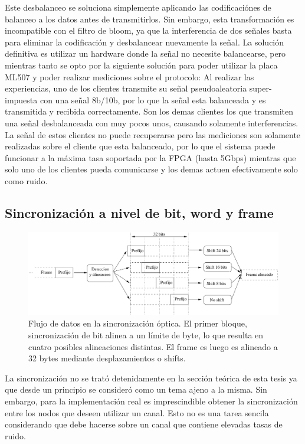 Este desbalanceo se soluciona simplemente aplicando las codificaciónes de balanceo a los datos antes de transmitirlos. Sin embargo, esta transformación es incompatible con el filtro de bloom, ya que la interferencia de dos señales basta para eliminar la codificación y desbalancear nuevamente la señal. La solución definitiva es utilizar un hardware donde la señal no necesite balancearse, pero mientras tanto se opto por la siguiente solución para poder utilizar la placa ML507 y poder realizar mediciones sobre el protocolo: Al realizar las experiencias, uno de los clientes transmite su señal pseudoaleatoria super-impuesta con una señal 8b/10b, por lo que la señal esta balanceada y es transmitida y recibida correctamente. Son los demas clientes los que transmiten una señal desbalanceada con muy pocos unos, causando solamente interferencias. La señal de estos clientes no puede recuperarse pero las mediciones son solamente realizadas sobre el cliente que esta balanceado, por lo que el sistema puede funcionar a la máxima tasa soportada por la FPGA (hasta 5Gbps) mientras que solo uno de los clientes pueda comunicarse y los demas actuen efectivamente solo como ruido.

\subsection{Sincronización a nivel de bit, word y frame}

\begin{figure}[t]
  \centering
    \includegraphics[width=6in]{graphs/optsync.pdf}
\caption {Flujo de datos en la sincronización óptica. El primer bloque, sincronización de bit alinea a un límite de byte, lo que resulta en cuatro posibles alineaciones distintas. El frame es luego es alineado a 32 bytes mediante desplazamientos o shifts.}
\label{fig:optsync}
\end{figure}


La sincronización no se trató detenidamente en la sección teórica de esta tesis ya que desde un principio se consideró como un tema ajeno a la misma. Sin embargo, para la implementación real es imprescindible obtener la sincronización entre los nodos que deseen utilizar un canal. Esto no es una tarea sencila considerando que debe hacerse sobre un canal que contiene elevadas tasas de ruido.

